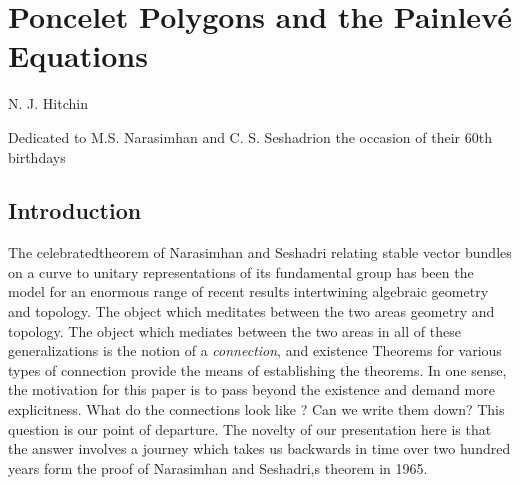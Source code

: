 \chapter{Poncelet Polygons and the Painlev\'e Equations}

\begin{center}
N. J. Hitchin

\medskip
Dedicated to M.S. Narasimhan and C. S. Seshadri\break on the occasion of their 60th birthdays
\end{center}


\setcounter{pageoriginal}{150}
\section{Introduction}\label{art7-sec-1}
The celebrated\pageoriginale theorem of Narasimhan and Seshadri \cite{art7-key13} relating stable vector bundles on a curve to unitary representations of its fundamental group has been the model for an enormous range of recent results intertwining algebraic geometry and topology. The object which meditates between the two areas geometry and topology. The object which mediates between the two areas in all of these generalizations is the notion of a \textit{connection}, and existence Theorems for various types of connection provide the means of establishing the theorems. In one sense, the motivation for this paper is to pass beyond the existence and demand more explicitness. What do the connections look like ? Can we write them down? This question is our point of departure. The novelty of our presentation here is that the answer involves a journey which takes us backwards in time over two hundred years form the proof of Narasimhan and Seshadri,s theorem in 1965.

